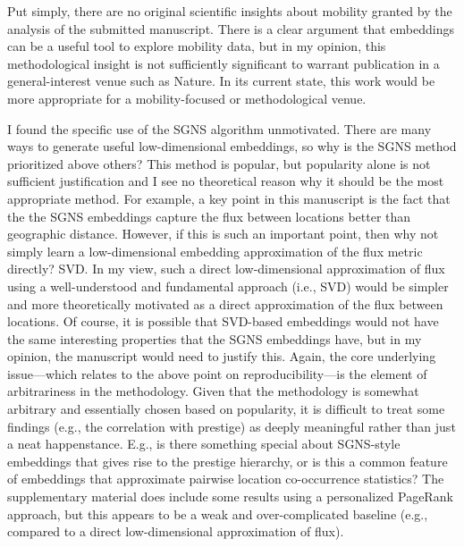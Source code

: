 \documentclass[12pt,a4paper]{article}
\newcommand{\rcomment}[1]{%
\vspace{10pt}
\begin{tcolorbox}[colback=black!3,colframe=white!45!black]
#1
\end{tcolorbox}
}
\begin{document}
\rcomment{
Put simply, there are no original scientific insights about mobility granted by the analysis of the submitted manuscript. There is a clear argument that embeddings can be a useful tool to explore mobility data, but in my opinion, this methodological insight is not sufficiently significant to warrant publication in a general-interest venue such as Nature. In its current state, this work would be more appropriate for a mobility-focused or methodological venue.

I found the specific use of the SGNS algorithm unmotivated. There are many ways to generate useful low-dimensional embeddings, so why is the SGNS method prioritized above others? This method is popular, but popularity alone is not sufficient justification and I see no theoretical reason why it should be the most appropriate method. For example, a key point in this manuscript is the fact that the the SGNS embeddings capture the flux between locations better than geographic distance. However, if this is such an important point, then why not simply learn a low-dimensional embedding approximation of the flux metric directly? SVD. In my view, such a direct low-dimensional approximation of flux using a well-understood and fundamental approach (i.e., SVD) would be simpler and more theoretically motivated as a direct approximation of the flux between locations. Of course, it is possible that SVD-based embeddings would not have the same interesting properties that the SGNS embeddings have, but in my opinion, the manuscript would need to justify this. Again, the core underlying issue—which relates to the above point on reproducibility—is the element of arbitrariness in the methodology. Given that the methodology is somewhat arbitrary and essentially chosen based on popularity, it is difficult to treat some findings (e.g., the correlation with prestige) as deeply meaningful rather than just a neat happenstance. E.g., is there something special about SGNS-style embeddings that gives rise to the prestige hierarchy, or is this a common feature of embeddings that approximate pairwise location co-occurrence statistics? The supplementary material does include some results using a personalized PageRank approach, but this appears to be a weak and over-complicated baseline (e.g., compared to a direct low-dimensional approximation of flux).

}
\end{document}
